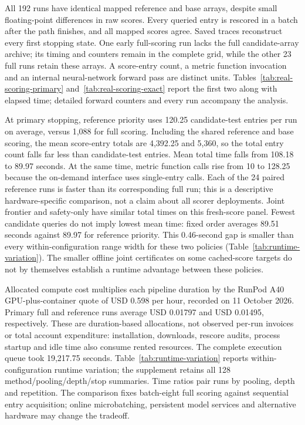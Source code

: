 All 192 runs have identical mapped reference and base arrays, despite small floating-point differences in raw scores. Every queried entry is rescored in a batch after the path finishes, and all mapped scores agree. Saved traces reconstruct every first stopping state. One early full-scoring run lacks the full candidate-array archive; its timing and counters remain in the complete grid, while the other 23 full runs retain these arrays. A score-entry count, a metric function invocation and an internal neural-network forward pass are distinct units. Tables~\ref{tab:real-scoring-primary} and~\ref{tab:real-scoring-exact} report the first two along with elapsed time; detailed forward counters and every run accompany the analysis.




At primary stopping, reference priority uses 120.25 candidate-test entries per run on average, versus 1,088 for full scoring. Including the shared reference and base scoring, the mean score-entry totals are 4,392.25 and 5,360, so the total entry count falls far less than candidate-test entries. Mean total time falls from 108.18 to 89.97 seconds. At the same time, metric function calls rise from 10 to 128.25 because the on-demand interface uses single-entry calls. Each of the 24 paired reference runs is faster than its corresponding full run; this is a descriptive hardware-specific comparison, not a claim about all scorer deployments. Joint frontier and safety-only have similar total times on this fresh-score panel. Fewest candidate queries do not imply lowest mean time: fixed order averages 89.51 seconds against 89.97 for reference priority. This 0.46-second gap is smaller than every within-configuration range width for these two policies (Table~\ref{tab:runtime-variation}). The smaller offline joint certificates on some cached-score targets do not by themselves establish a runtime advantage between these policies.

Allocated compute cost multiplies each pipeline duration by the RunPod A40 GPU-plus-container quote of USD 0.598 per hour, recorded on 11 October 2026. Primary full and reference runs average USD 0.01797 and USD 0.01495, respectively. These are duration-based allocations, not observed per-run invoices or total account expenditure: installation, downloads, rescore audits, process startup and idle time also consume rented resources. The complete execution queue took 19,217.75 seconds. Table~\ref{tab:runtime-variation} reports within-configuration runtime variation; the supplement retains all 128 method/pooling/depth/stop summaries. Time ratios pair runs by pooling, depth and repetition. The comparison fixes batch-eight full scoring against sequential entry acquisition; online microbatching, persistent model services and alternative hardware may change the tradeoff.

